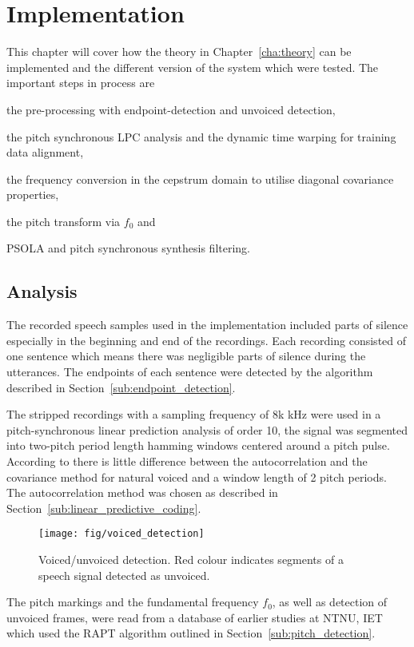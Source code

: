\chapter{Implementation} %
\label{cha:implementation}
This chapter will cover how the theory in Chapter~\ref{cha:theory} can be implemented and the different version of the system which were tested. The important steps in process are \begin{inparaenum}  \item the pre-processing with endpoint-detection and unvoiced detection, \item the pitch synchronous LPC analysis and the dynamic time warping for training data alignment, \item the frequency conversion in the cepstrum domain to utilise diagonal covariance properties, \item the pitch transform via $f_0$ and \item PSOLA and pitch synchronous synthesis filtering. \end{inparaenum}

\section{Analysis} %
\label{sec:analysis}
The recorded speech samples used in the implementation included parts of silence especially in the beginning and end of the recordings. Each recording consisted of one sentence which means there was negligible parts of silence during the utterances. The endpoints of each sentence were detected by the algorithm described in Section~\ref{sub:endpoint_detection}.

The stripped recordings with a sampling frequency of 8k kHz were used in a pitch-synchronous linear prediction analysis of order 10, \ie the signal was segmented into two-pitch period length hamming windows centered around a pitch pulse. According to \cite{chandra74} there is little difference between the autocorrelation and the covariance method for natural voiced and a window length of 2 pitch periods. The autocorrelation method was chosen as described in Section~\ref{sub:linear_predictive_coding}. 
\begin{figure}[htbp]
	\begin{center}
		\texttt{[image: fig/voiced\_detection]}
		\caption{Voiced/unvoiced detection. Red colour indicates segments of a speech signal detected as unvoiced.}
		\label{fig:voiced_detection}
	\end{center}
\end{figure}
The pitch markings and the fundamental frequency $f_0$, as well as detection of unvoiced frames, were read from a database of earlier studies at NTNU, IET which used the RAPT algorithm outlined in Section~\ref{sub:pitch_detection}.

